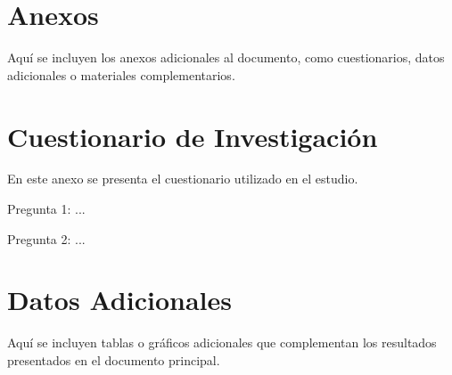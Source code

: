 \section{Anexos}

Aquí se incluyen los anexos adicionales al documento, como cuestionarios, datos adicionales o materiales complementarios.

\section{Cuestionario de Investigación}

En este anexo se presenta el cuestionario utilizado en el estudio.

Pregunta 1: ...

Pregunta 2: ...

\section{Datos Adicionales}

Aquí se incluyen tablas o gráficos adicionales que complementan los resultados presentados en el documento principal.